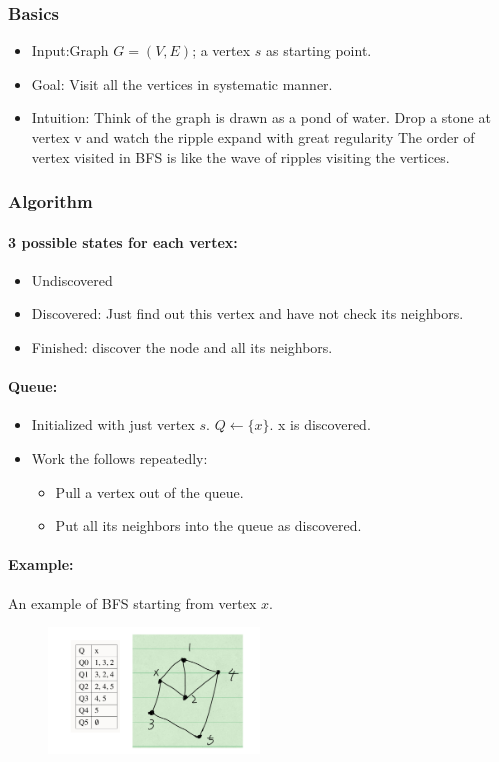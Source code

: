 \documentclass[en,hazy,blue,screen,14pt]{elegantnote}
\begin{document}
\subsubsection{Basics}
\begin{itemize}
    \item Input:Graph $G = (V, E)$; a vertex $s$ as starting point.
    \item Goal: Visit all the vertices in systematic manner.
    \item Intuition: Think of the graph is drawn as a pond of water. Drop a 
stone at vertex v and watch the ripple expand with great regularity The 
order of vertex visited in BFS is like the wave of ripples visiting the 
vertices.
\end{itemize}

\subsubsection{Algorithm}

\paragraph{3 possible states for each vertex:}
\begin{itemize}
 \item Undiscovered
 \item Discovered: Just find out this vertex and have not check its neighbors.
 \item Finished: discover the node and all its neighbors.
\end{itemize}
\paragraph{Queue:}
\begin{itemize}
 \item Initialized with just vertex $s$. $Q \leftarrow \{x\}$. x is discovered.
 \item Work the follows repeatedly:
 \begin{itemize}
  \item Pull a vertex out of the queue.
  \item Put all its neighbors into the queue as discovered.
 \end{itemize}
\end{itemize}

\paragraph{Example:}
An example of BFS starting from vertex $x$.
\begin{figure}[H]
\centering
\includegraphics[width=0.5\textwidth]{queue.png}
\end{figure}
\end{document}
